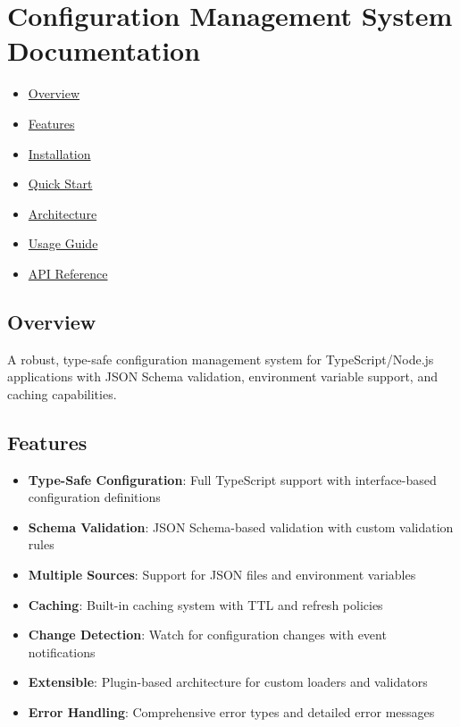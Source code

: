 \hypertarget{configuration-management-system-documentation}{%
\section{Configuration Management System
Documentation}\label{configuration-management-system-documentation}}

\begin{itemize}
\tightlist
\item
  \protect\hyperlink{overview}{Overview}
\item
  \protect\hyperlink{features}{Features}
\item
  \protect\hyperlink{installation}{Installation}
\item
  \protect\hyperlink{quick-start}{Quick Start}
\item
  \protect\hyperlink{architecture}{Architecture}
\item
  \protect\hyperlink{usage-guide}{Usage Guide}
\item
  \protect\hyperlink{api-reference}{API Reference}
\end{itemize}

\hypertarget{overview}{%
\subsection{Overview}\label{overview}}

A robust, type-safe configuration management system for
TypeScript/Node.js applications with JSON Schema validation, environment
variable support, and caching capabilities.

\hypertarget{features}{%
\subsection{Features}\label{features}}

\begin{itemize}
\tightlist
\item
  \textbf{Type-Safe Configuration}: Full TypeScript support with
  interface-based configuration definitions
\item
  \textbf{Schema Validation}: JSON Schema-based validation with custom
  validation rules
\item
  \textbf{Multiple Sources}: Support for JSON files and environment
  variables
\item
  \textbf{Caching}: Built-in caching system with TTL and refresh
  policies
\item
  \textbf{Change Detection}: Watch for configuration changes with event
  notifications
\item
  \textbf{Extensible}: Plugin-based architecture for custom loaders and
  validators
\item
  \textbf{Error Handling}: Comprehensive error types and detailed error
  messages
\end{itemize}

